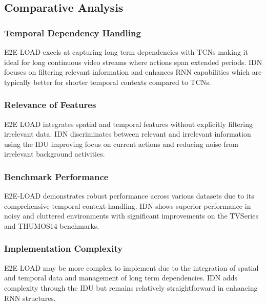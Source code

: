 {\subsection{Comparative Analysis
}

\subsubsection{Temporal Dependency Handling
}
E2E LOAD excels at capturing long term dependencies with TCNs  making it ideal for long continuous video streams where actions span extended periods.
IDN focuses on filtering relevant information and enhances RNN capabilities which are typically better for shorter temporal contexts compared to TCNs.

\subsubsection{Relevance of Features
}
E2E LOAD integrates spatial and temporal features without explicitly filtering irrelevant data.
IDN discriminates between relevant and irrelevant information using the IDU improving focus on current actions and reducing noise from irrelevant background activities.

\subsubsection{Benchmark Performance
}
E2E-LOAD demonstrates robust performance across various datasets due to its comprehensive temporal context handling.
IDN shows superior performance in noisy and cluttered environments with significant improvements on the TVSeries and THUMOS14 benchmarks.

\subsubsection{Implementation Complexity
}
E2E LOAD may be more complex to implement due to the integration of spatial and temporal data and management of long term dependencies.
IDN adds complexity through the IDU but remains relatively straightforward in enhancing RNN structures.

}